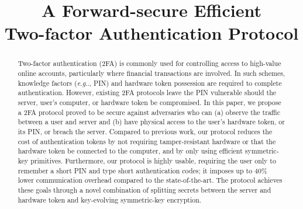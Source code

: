 \documentclass[runningheads]{llncs}
\makeatletter
\DeclareRobustCommand\onedot{\futurelet\@let@token\@onedot}
\def\@onedot{\ifx\@let@token.\else.\null\fi\xspace}
\def\eg{\emph{e.g}\onedot} \def\Eg{\emph{E.g}\onedot}
\makeatother
\begin{document}
\title{A Forward-secure Efficient\\ Two-factor Authentication Protocol}

\author{}
\institute{}

\maketitle  

\begin{abstract}
Two-factor authentication (2FA) is commonly used for controlling access to high-value online accounts, particularly where financial transactions are involved.
In such schemes, knowledge factors (\eg, PIN) and hardware token possession are required to complete authentication.
However, existing 2FA protocols leave the PIN vulnerable should the server, user's computer, or hardware token be compromised.
In this paper, we propose a 2FA protocol proved to be secure against adversaries who can (a) observe the traffic between a user and server and (b) have physical access to the user’s hardware token, or its PIN, or breach the server.
Compared to previous work, our protocol reduces the cost of authentication tokens by not requiring tamper-resistant hardware or that the hardware token be connected to the computer, and by only using efficient symmetric-key primitives.
Furthermore, our protocol is highly usable, requiring the user only to remember a short PIN and type short authentication codes; it imposes up to 40\% lower communication overhead compared to the state-of-the-art.
The protocol achieves these goals through a novel combination of splitting secrets between the server and hardware token and key-evolving symmetric-key encryption.
\end{abstract}
\end{document}
